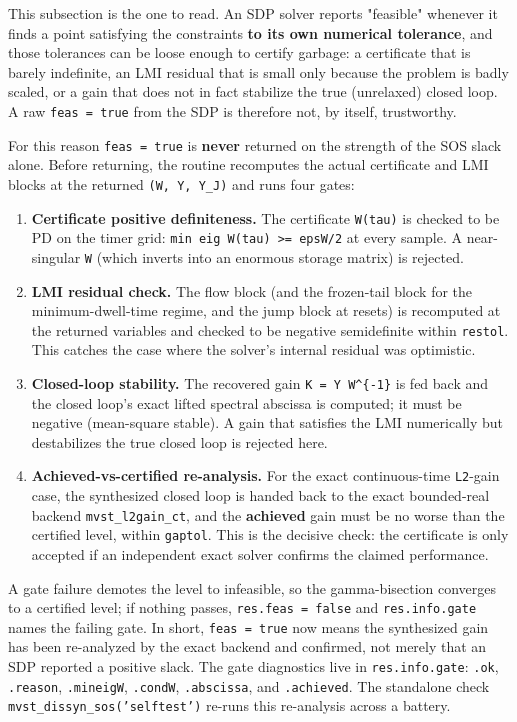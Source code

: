 \documentclass[11pt,oneside]{report}
\newcommand{\code}[1]{\texttt{#1}}
\providecommand{\tightlist}{\setlength{\itemsep}{0pt}\setlength{\parskip}{0pt}}
\begin{document}
This subsection is the one to read. An SDP solver reports "feasible" whenever it
finds a point satisfying the constraints \textbf{to its own numerical tolerance}, and
those tolerances can be loose enough to certify garbage: a certificate that is
barely indefinite, an LMI residual that is small only because the problem is
badly scaled, or a gain that does not in fact stabilize the true (unrelaxed)
closed loop. A raw \code{feas = true} from the SDP is therefore not, by itself,
trustworthy.

For this reason \code{feas = true} is \textbf{never} returned on the strength of the SOS
slack alone. Before returning, the routine recomputes the actual certificate and
LMI blocks at the returned \code{(W, Y, Y\_J)} and runs four gates:

\begin{enumerate}
\def\labelenumi{\arabic{enumi}.}
\tightlist
\item
  \textbf{Certificate positive definiteness.} The certificate \code{W(tau)} is checked to
  be PD on the timer grid: \code{min eig W(tau) \textgreater{}= epsW/2} at every
  sample. A near-singular \code{W} (which inverts into an enormous storage matrix)
  is rejected.
\item
  \textbf{LMI residual check.} The flow block (and the frozen-tail block for the
  minimum-dwell-time regime, and the jump block at resets) is recomputed at the
  returned variables and checked to be negative semidefinite within \code{restol}.
  This catches the case where the solver's internal residual was optimistic.
\item
  \textbf{Closed-loop stability.} The recovered gain \code{K = Y W\^{}\{-1\}} is fed back and
  the closed loop's exact lifted spectral abscissa is computed; it must be
  negative (mean-square stable). A gain that satisfies the LMI numerically but
  destabilizes the true closed loop is rejected here.
\item
  \textbf{Achieved-vs-certified re-analysis.} For the exact continuous-time
  \code{L2}-gain case, the synthesized closed loop is handed back to the exact
  bounded-real backend \code{mvst\_l2gain\_ct}, and the \textbf{achieved} gain must be no
  worse than the certified level, within \code{gaptol}. This is the decisive check:
  the certificate is only accepted if an independent exact solver confirms the
  claimed performance.
\end{enumerate}

A gate failure demotes the level to infeasible, so the gamma-bisection converges
to a certified level; if nothing passes, \code{res.feas = false} and
\code{res.info.gate} names the failing gate. In short, \code{feas = true} now means the
synthesized gain has been re-analyzed by the exact backend and confirmed, not
merely that an SDP reported a positive slack. The gate diagnostics live in
\code{res.info.gate}: \code{.ok}, \code{.reason}, \code{.mineigW}, \code{.condW}, \code{.abscissa}, and
\code{.achieved}. The standalone check \code{mvst\_dissyn\_sos('selftest')} re-runs this
re-analysis across a battery.
\end{document}
